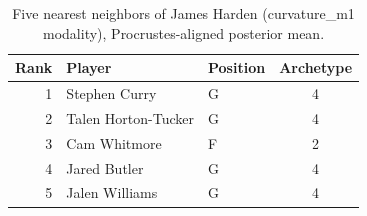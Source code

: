 \begin{table}[htbp]
  \centering\small
  \begin{tabular}{rllc}
    \toprule
    Rank & Player & Position & Archetype \\
    \midrule
    1 & Stephen Curry & G & 4 \\
    2 & Talen Horton-Tucker & G & 4 \\
    3 & Cam Whitmore & F & 2 \\
    4 & Jared Butler & G & 4 \\
    5 & Jalen Williams & G & 4 \\
    \bottomrule
  \end{tabular}
  \caption{Five nearest neighbors of James Harden (curvature_m1 modality), Procrustes-aligned posterior mean.}
  \label{tab:James_Harden_neighbors_curvature_m1}
\end{table}

